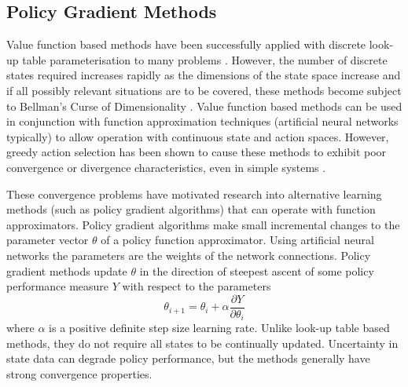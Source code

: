 \subsection{Policy Gradient Methods}
\label{sec:policygradient}
Value function based methods have been successfully applied with discrete
look-up table parameterisation to many problems \cite{bertsekas:96}.  However,
the number of discrete states required increases rapidly as the dimensions of
the state space increase and if all possibly relevant situations are to be
covered, these methods become subject to Bellman's Curse of Dimensionality
\cite{bellman:1961}.
 Value function based methods can be used in conjunction with function
approximation techniques (artificial neural networks typically) to allow
operation with continuous state and action spaces.  However, greedy action
selection has been shown to cause these methods to exhibit poor convergence or
divergence characteristics, even in simple systems
\cite{tsitsiklis:94,peters:enac,gordon:95,baird:95}.

These convergence problems have motivated research into alternative learning
methods (such as policy gradient algorithms) that can operate with function
approximators.  Policy gradient algorithms make small incremental changes to the
parameter vector $\theta$ of a policy function approximator.  Using artificial
neural networks the parameters are the weights of the network connections.
Policy gradient methods update $\theta$ in the direction of steepest ascent of
some policy performance measure $Y$ with respect to the parameters
\begin{equation}
\theta_{i+1} = \theta_i + \alpha \frac{\partial Y}{\partial \theta_i}
\end{equation}
where $\alpha$ is a positive definite step size learning rate.  Unlike look-up
table based methods, they do not require all states to be continually updated.
Uncertainty in state data can degrade policy performance, but the methods
generally have strong convergence properties.

